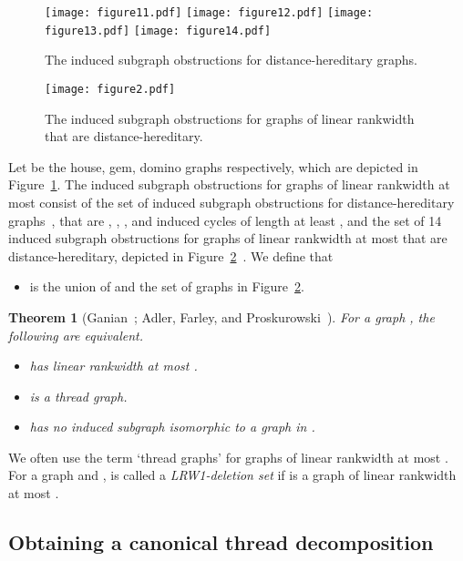 \documentclass[11pt]{article}
\newtheorem{theorem}{Theorem}[section]
\theoremstyle{remark}
\newcommand\house{}
\newcommand\gem{}
\newcommand\domino{}
\newcommand{\DEL}{LRW1-deletion set}
\begin{document}
\begin{figure}
\centerline{\texttt{[image: figure11.pdf]} \quad
\texttt{[image: figure12.pdf]} \quad
\texttt{[image: figure13.pdf]} \quad
\texttt{[image: figure14.pdf]}}
\caption{The induced subgraph obstructions for distance-hereditary graphs.}
\label{fig:obsdh}
\end{figure}


\begin{figure}
\centerline{\texttt{[image: figure2.pdf]}}
\vspace{-0.5cm}
\caption{The induced subgraph obstructions for graphs of linear rankwidth  that are distance-hereditary.}
\label{fig:obslrw1}
\end{figure}


Let  be the house, gem, domino graphs respectively, which are depicted in Figure~\ref{fig:obsdh}.
The induced subgraph obstructions for graphs of linear rankwidth at most  consist of the set of induced subgraph obstructions for distance-hereditary graphs~\cite{BM1986}, that are \house, \gem, \domino, and induced cycles of length at least , and the set of 14 induced subgraph obstructions for graphs of linear rankwidth at most  that are distance-hereditary, depicted in Figure~\ref{fig:obslrw1}~\cite{AFP2013}.
We define that
\begin{itemize}
\item  is the union of  and the set of  graphs in Figure~\ref{fig:obslrw1}.
\end{itemize}




\begin{theorem}[Ganian~\cite{Ganian10}; Adler, Farley, and Proskurowski~\cite{AFP2013}]\label{thm:structurethread}
For a graph , the following are equivalent.
\begin{itemize}
\item  has linear rankwidth at most .
\item  is a thread graph.
\item  has no induced subgraph isomorphic to a graph in .
\end{itemize}
\end{theorem}



We often use the term `thread graphs' for graphs of linear rankwidth at most .
For a graph  and ,  is called a \emph{\DEL} if  is a graph of linear rankwidth at most .


\subsection*{Obtaining a canonical thread decomposition}
\end{document}
